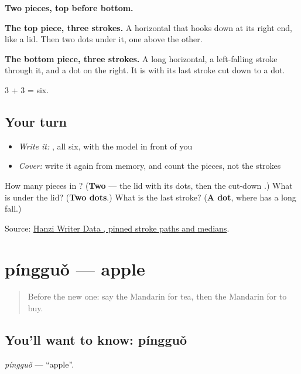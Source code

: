 \begin{quote}
\end{quote}

\textbf{Two pieces, top before bottom.}

\textbf{The top piece, three strokes.} A horizontal that hooks down at its right end, like a lid. Then two dots under it, one above the other.

\textbf{The bottom piece, three strokes.} A long horizontal, a left-falling stroke through it, and a dot on the right. It is  with its last stroke cut down to a dot.

3 + 3 = six.

\subsection*{Your turn}
\begin{itemize}
\raggedright
  \item \emph{Write it:} , all six, with the model in front of you
  \item \emph{Cover:} write it again from memory, and count the pieces, not the strokes
\end{itemize}

\begin{tcolorbox}[breakable,colback=teal!4,colframe=teal!35!black,title={Before you move on}]
How many pieces in ? (\textbf{Two} — the lid with its dots, then the cut-down .) What is under the lid? (\textbf{Two dots}.) What is the last stroke? (\textbf{A dot}, where  has a long fall.)

Source: \href{https://raw.githubusercontent.com/chanind/hanzi-writer-data/68d10a4b21150cae5e1ebbd223eed289cf32d90c/data/\%E4\%B9\%B0.json}{Hanzi Writer Data , pinned stroke paths and medians}.
\end{tcolorbox}
\section[píngguǒ]{píngguǒ — apple}

\label{lesson:ZH-C40-pingguo}



\begin{quote}
Before the new one: say the Mandarin for tea, then the Mandarin for to buy.
\end{quote}

\subsection*{You'll want to know: píngguǒ}
\emph{píngguǒ} — \textquotedblleft{}apple\textquotedblright{}.

